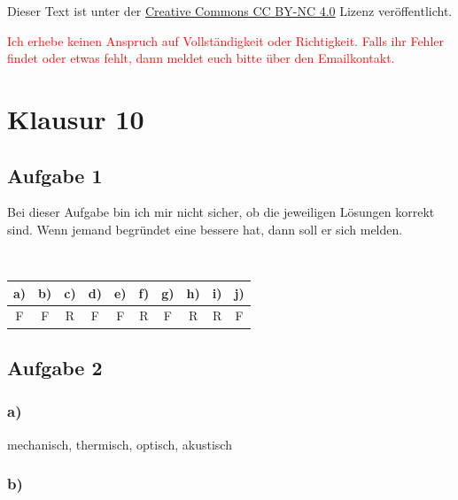 
\usepackage{paralist}


\maketitle

Dieser Text ist unter der
\href{http://creativecommons.org/licenses/by-nc/4.0/}{Creative Commons CC BY-NC 4.0}
Lizenz veröffentlicht.

\textcolor{red}{%
    Ich erhebe keinen Anspruch auf Vollständigkeit oder Richtigkeit. Falls ihr
    Fehler findet oder etwas fehlt, dann meldet euch bitte über den
    Emailkontakt.
}


\tableofcontents

\newpage


\section{Klausur 10}

\subsection{Aufgabe 1}

Bei dieser Aufgabe bin ich mir nicht sicher, ob die jeweiligen Lösungen korrekt sind. Wenn jemand begründet eine bessere hat, dann soll er sich melden.

\hfill\\

\begin{center}
\begin{tabular}{c|c|c|c|c|c|c|c|c|c}
a) & b) & c) & d) & e) & f) & g) & h) & i) & j) \\ 
\hline 
F & F & R & F & F & R & F & R & R & F \\ 
\end{tabular} 
\end{center}


\subsection{Aufgabe 2}

\subsubsection*{a)}

mechanisch, thermisch, optisch, akustisch

\subsubsection*{b)}

